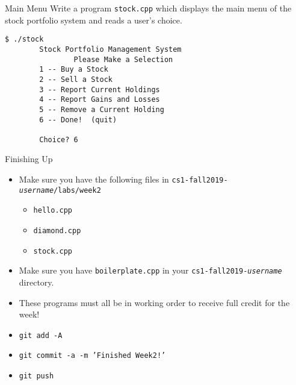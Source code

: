 \documentclass{beamer}
\begin{document}
\begin{frame}[fragile]{Main Menu}
Write a program \texttt{stock.cpp} which displays the main menu of the
stock portfolio system and reads a user's choice.  
\begin{verbatim}
$ ./stock
        Stock Portfolio Management System
                Please Make a Selection
        1 -- Buy a Stock
        2 -- Sell a Stock
        3 -- Report Current Holdings
        4 -- Report Gains and Losses
        5 -- Remove a Current Holding
        6 -- Done!  (quit) 

        Choice? 6
\end{verbatim}

\end{frame}

\begin{frame}{Finishing Up}
\begin{itemize}
    \item Make sure you have the following files in
        \texttt{cs1-fall2019-{\em username}/labs/week2}
        \begin{itemize}
            \item \texttt{hello.cpp}
            \item \texttt{diamond.cpp}
            \item \texttt{stock.cpp}
        \end{itemize}
    \item Make sure you have \texttt{boilerplate.cpp} in your
        \texttt{cs1-fall2019-{\em username}} directory.
    \item These programs must all be in working order to receive full
        credit for the week!
    \item \texttt{git add -A}
    \item \texttt{git commit -a -m 'Finished Week2!'}
    \item \texttt{git push}
\end{itemize}
\end{frame}
\end{document}

